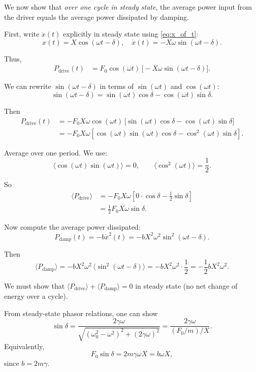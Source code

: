 \documentclass[12pt]{article}
\begin{document}
\begin{enumerate}
We now show that \emph{over one cycle in steady state}, the average power input from the driver equals the average power dissipated by damping.

First, write $\dot{x}(t)$ explicitly in steady state using \eqref{eq:x_of_t}:
\[
x(t) = X \cos(\omega t - \delta),
\quad
\dot{x}(t) = -X \omega \sin(\omega t - \delta).
\]

Thus,
\begin{align}
P_\text{drive}(t)
&= F_0 \cos(\omega t)\, \big[-X \omega \sin(\omega t - \delta)\big].
\end{align}

We can rewrite $\sin(\omega t - \delta)$ in terms of $\sin(\omega t)$ and $\cos(\omega t)$:
\[
\sin(\omega t - \delta)
= \sin(\omega t)\cos\delta - \cos(\omega t)\sin\delta.
\]

Then
\begin{align}
P_\text{drive}(t)
&= -F_0 X \omega \cos(\omega t)\,
\big[ \sin(\omega t)\cos\delta - \cos(\omega t)\sin\delta \big] \\
&= -F_0 X \omega
\left[
\cos(\omega t)\sin(\omega t)\cos\delta
- \cos^2(\omega t)\sin\delta
\right].
\end{align}

Average over one period. We use:
\[
\langle \cos(\omega t)\sin(\omega t) \rangle = 0,
\qquad
\langle \cos^2(\omega t) \rangle = \frac{1}{2}.
\]

So
\begin{align}
\langle P_\text{drive} \rangle
&= -F_0 X \omega
\left[
0 \cdot \cos\delta
- \frac{1}{2}\sin\delta
\right] \\
&= \frac{1}{2} F_0 X \omega \sin\delta.
\label{eq:Pdrive_avg}
\end{align}

Now compute the average power dissipated:
\[
P_\text{damp}(t) = - b \dot{x}^2(t)
= - b X^2 \omega^2 \sin^2(\omega t - \delta).
\]

Then
\[
\langle P_\text{damp} \rangle
= - b X^2 \omega^2 \, \langle \sin^2(\omega t - \delta) \rangle
= - b X^2 \omega^2 \cdot \frac{1}{2}
= -\frac{1}{2} b X^2 \omega^2.
\label{eq:Pdamp_avg_prelim}
\]

We must show that $\langle P_\text{drive} \rangle + \langle P_\text{damp} \rangle = 0$ in steady state (no net change of energy over a cycle).

From steady-state phasor relations, one can show
\[
\sin\delta = \frac{2\gamma \omega}{\sqrt{(\omega_0^2 - \omega^2)^2 + (2 \gamma \omega)^2}}
= \frac{2\gamma \omega}{(F_0/m)/X}.
\]
Equivalently,
\[
F_0 \sin\delta
= 2 m \gamma \omega X
= b \omega X,
\]
since $b = 2 m \gamma$.


\end{enumerate}
\end{document}
